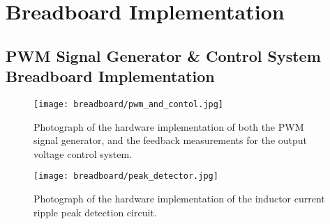 \chapter{Breadboard Implementation}\label{A:breadboard}

\section*{PWM Signal Generator \& Control System Breadboard Implementation}

\begin{figure}[H]
    \begin{center}
        \texttt{[image: breadboard/pwm\_and\_contol.jpg]}
        \caption{Photograph of the hardware implementation of both the PWM signal generator, and the feedback measurements for the output voltage control system.}
    \end{center}
\end{figure}

\begin{figure}[H]
    \begin{center}
        \texttt{[image: breadboard/peak\_detector.jpg]}
        \caption{Photograph of the hardware implementation of the inductor current ripple peak detection circuit.}
    \end{center}
\end{figure}

